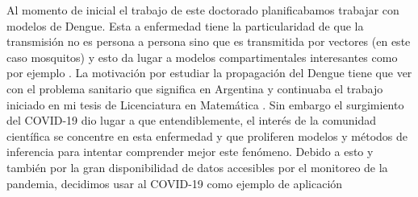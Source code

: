 Al momento de inicial el trabajo de este doctorado planificabamos trabajar con modelos de Dengue. Esta a enfermedad tiene la particularidad de que la transmisión no es persona a persona sino que es transmitida por vectores (en este caso mosquitos) y esto da lugar a modelos compartimentales interesantes como por ejemplo \cite{}. La motivación por estudiar la propagación del Dengue tiene que ver con el problema sanitario que significa en Argentina y continuaba el trabajo iniciado en mi tesis de Licenciatura en Matemática \citep{}. Sin embargo el surgimiento del COVID-19 dio lugar a que entendiblemente, el interés de la comunidad científica se concentre en esta enfermedad y que proliferen modelos y métodos de inferencia para intentar comprender mejor este fenómeno. Debido a esto y también por la gran disponibilidad de datos accesibles por el monitoreo de la pandemia, decidimos usar al COVID-19 como ejemplo de aplicación
